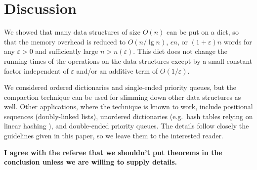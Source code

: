 \documentclass{DIKU-article}
\newcommand{\comment}[1]{}
\newcommand{\Erase}{\mbox{$\mathit{erase}$}}
\newcommand{\Findmin}{\mbox{$\mathit{find}$\textnormal{-}}\allowbreak{}\mbox{$\mathit{minimum}$}}
\newcommand{\Findmax}{\mbox{$\mathit{find}$\textnormal{-}}\allowbreak{}\mbox{$\mathit{maximum}$}}
\newcommand{\Insert}{\mbox{$\mathit{insert}$}}
\newcommand{\Borrow}{\mbox{$\mathit{borrow}$}}
\newcommand{\seclabel}[1]{\label{sec:#1}}
\begin{document}
\section{Discussion}\seclabel{discussion}

We showed that many data structures of size $O(n)$ can be put on a
diet, so that the memory overhead is reduced to $O(n/\lg n)$,
$\epsilon n$, or $(1 + \varepsilon)n$ words for any $\varepsilon >0$
and sufficiently large $n > n(\varepsilon)$. This diet does not change
the running times of the operations on the data structures except by a
small constant factor independent of $\varepsilon$ and/or an additive
term of $O(1/\varepsilon)$.

We considered ordered dictionaries and single-ended priority queues,
but the compaction technique can be used for slimming down other data
structures as well. Other applications, where the technique is known
to work, include positional sequences (doubly-linked lists), unordered
dictionaries (e.g.~hash tables relying on linear hashing
\cite{Lit80}), and double-ended priority queues.  The details follow
closely the guidelines given in this paper, so we leave them
to the interested reader.

\textbf{I agree with the referee that we shouldn't put theorems in the
conclusion unless we are willing to supply details.}

\comment{
\begin{theorem}
A positional sequence, which provides locator-based updates and
bidirectional iterators, can be transformed into an equivalent data
structure that uses $(1 + \varepsilon)n$ words of memory, for any
$\varepsilon > 0$ and sufficiently large $n > n(\varepsilon)$,
excluding the space used by the $n$ elements stored. This
transformation only slows down the running time of the supported
operations by an additive term of $O(1/\varepsilon)$.
\end{theorem}

\begin{theorem}
An unordered dictionary, which relies on chaining and provides member
searches and updates, can be transformed into an equivalent data
structure that uses $(1 + \varepsilon)n$ words of extra storage, for
any $\varepsilon > 0$ and sufficiently large $n > n(\varepsilon)$.
This transformation slows down the running time of the supported
operations by a \emph{multiplicative factor} of $O(1/\varepsilon)$,
except that the slowdown is an additive term of $O(1/\varepsilon)$ for
\Insert{} when a multiset is stored and for locator-based \Erase{}.
\end{theorem}

\begin{theorem}
A doubly-ended priority queue, which uses $O(n)$ words of extra
storage and provides methods \Findmin{}, \Findmax{}, \Insert{},
\Borrow{}, and \Erase{}, can be transformed into an equivalent data
structure that uses $(1 + \varepsilon)n$ words of extra storage, for
any $\varepsilon > 0$ and sufficiently large $n > n(\varepsilon)$.
This transformation only slows down the running time of \Erase{} by an
additive term of $O(1/\varepsilon)$ and that of the other operations
by an additive term of $O(1)$.
\end{theorem}
}
\end{document}
